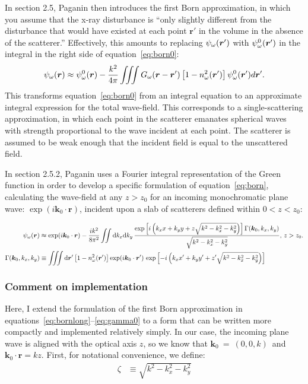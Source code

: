 \documentclass{article}
\begin{document}
In section 2.5, Paganin then introduces the first Born approximation, in which
you assume that the x-ray disturbance is ``only slightly different from the
disturbance that would have existed at each point $\bm{r}'$ in the volume in the
absence of the scatterer.'' Effectively, this amounts to replacing
$\psi_{\omega}(\bm{r}')$ with $\psi_{\omega}^0(\bm{r}')$ in the integral in the right side of
equation~\ref{eq:born0}:
\begin{align}
  \psi_{\omega}(\bm{r}) \approx \psi_{\omega}^0(\bm{r}) - \frac{k^2}{4\pi}\iiint G_{\omega}(\bm{r}-\bm{r}')\left[1 - n_{\omega}^2(\bm{r}')\right]\psi_{\omega}^0(\bm{r}')d\bm{r}'.
  \label{eq:born}
\end{align}
This transforms equation~\ref{eq:born0} from an integral equation to an
approximate integral expression for the total wave-field. This corresponds to a
single-scattering approximation, in which each point in the scatterer emanates
spherical waves with strength proportional to the wave incident at each
point. The scatterer is assumed to be weak enough that the incident field is
equal to the unscattered field.

In section 2.5.2, Paganin uses a Fourier integral representation of the Green
function in order to develop a specific formulation of equation~\ref{eq:born},
calculating the wave-field at any $z>z_0$ for an incoming monochromatic plane
wave: $\exp(i\bm{k}_0\cdot \bm{r})$, incident upon a slab of scatterers defined
within $0 < z < z_0$:

\begin{align}
  \psi_{\omega}(\bm{r}) &\approx \exp(i\bm{k}_0\cdot\bm{r}) - \frac{ik^2}{8\pi^2}\iint\mathrm{d}k_x\mathrm{d}k_y\,\frac{\exp\left[i\left(k_x x + k_y y + z\sqrt{k^2 - k_x^2 - k_y^2}\right)\right]\Gamma(\bm{k}_0, k_x, k_y)}{\sqrt{k^2-k_x^2-k_y^2}}\text{, } z > z_0.\label{eq:bornlong}\\
  \Gamma(\bm{k}_0, k_x, k_y) &\equiv \iiint\mathrm{d}\bm{r}'\left[1 - n_{\omega}^2(\bm{r}')\right]\exp(i\bm{k}_0\cdot\bm{r}')\text{ exp}\left[-i\left(k_x x' + k_y y' + z'\sqrt{k^2 - k_x^2 - k_y^2}\right)\right]\label{eq:gamma0}
\end{align}

\subsubsection{Comment on implementation}
Here, I extend the formulation of the first Born approximation in
equations~\ref{eq:bornlong}--\ref{eq:gamma0} to a form that can be written more
compactly and implemented relatively simply. In our case, the incoming plane
wave is aligned with the optical axis $z$, so we know that
$\bm{k}_0~=~(0, 0, k)$~and $\bm{k}_0\cdot\bm{r} = kz$. First, for notational
convenience, we define:
\begin{align}
  \zeta &\equiv \sqrt{k^2 - k_x^2 - k_y^2}  
\end{align}
\end{document}
